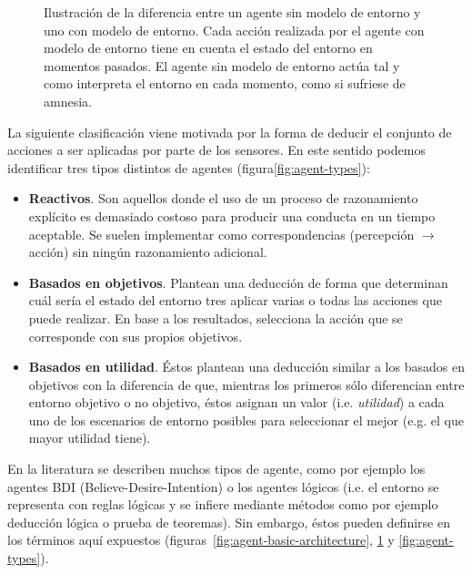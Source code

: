 \begin{figure}[t]
	\caption[Diferencias entre un agente sin y con modelo de entorno.]{Ilustración de la diferencia entre un agente sin modelo de entorno y uno con modelo de entorno. Cada acción realizada por el agente con modelo de entorno tiene en cuenta el estado del entorno en momentos pasados. El agente sin modelo de entorno actúa tal y como interpreta el entorno en cada momento, como si sufriese de amnesia.}
	\label{fig:memory-vs-amnesia-in-agents}
\end{figure}

La siguiente clasificación viene motivada por la forma de deducir el conjunto de acciones a ser aplicadas por parte de los sensores. En este sentido podemos identificar tres tipos distintos de agentes (figura\ref{fig:agent-types}):

\begin{itemize}
	\item \textbf{Reactivos}. Son aquellos donde el uso de un proceso de razonamiento explícito es demasiado costoso para producir una conducta en un tiempo aceptable. Se suelen implementar como correspondencias (percepción $\rightarrow$ acción) sin ningún razonamiento adicional.
	\item \textbf{Basados en objetivos}. Plantean una deducción de forma que determinan cuál sería el estado del entorno tres aplicar varias o todas las acciones que puede realizar. En base a los resultados, selecciona la acción que se corresponde con sus propios objetivos.
	\item \textbf{Basados en utilidad}. Éstos plantean una deducción similar a los basados en objetivos con la diferencia de que, mientras los primeros sólo diferencian entre entorno objetivo o no objetivo, éstos asignan un valor (i.e. \textit{utilidad}) a cada uno de los escenarios de entorno posibles para seleccionar el mejor (e.g. el que mayor utilidad tiene).
\end{itemize}

En la literatura se describen muchos tipos de agente, como por ejemplo los agentes BDI (Believe-Desire-Intention) o los agentes lógicos (i.e. el entorno se representa con reglas lógicas y se infiere mediante métodos como por ejemplo deducción lógica o prueba de teoremas). Sin embargo, éstos pueden definirse en los términos aquí expuestos (figuras~\ref{fig:agent-basic-architecture}, \ref{fig:memory-vs-amnesia-in-agents} y \ref{fig:agent-types}). 

